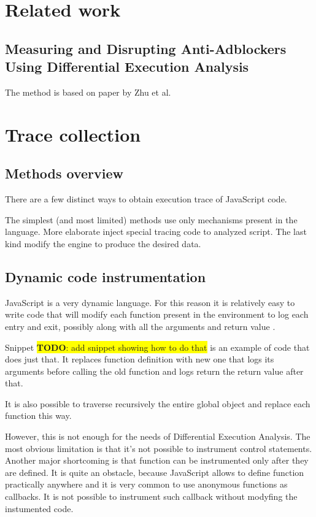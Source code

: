 \documentclass[en]{pracamgr}
\newcommand{\todo}[1]{\colorbox{yellow}{ \color{red} \textbf{TODO}: {#1}}}
\begin{document}
\chapter{Related work}
\section{Measuring and Disrupting Anti-Adblockers Using Differential Execution Analysis}

The method is based on paper by Zhu et al. \cite{DBLP:conf/ndss/ZhuHQSY18}



\chapter{Trace collection}

\section{Methods overview}
There are a few distinct ways to obtain execution trace of JavaScript code. 

The simplest (and most limited) methods use only mechanisms present in the language.
More elaborate inject special tracing code to analyzed script. The last kind modify the engine to produce
the desired data.

\section{Dynamic code instrumentation}
JavaScript is a very dynamic language. For this reason it is relatively easy to write code that will
modify each function present in the environment to log each entry and exit,
possibly along with all the arguments and return value \cite{stack:js-console-log}.

Snippet \todo{add snippet showing how to do that} is an example of code that does just that.
It replaces function definition with new one that logs its arguments before calling the old function and logs return
the return value after that. 

It is also possible to traverse recursively the entire global object and replace each function this way.

However, this is not enough for the needs of Differential Execution Analysis. 
The most obvious limitation is that it's not possible to instrument control statements.
Another major shortcoming is that function can be instrumented only after they are defined. 
It is quite an obstacle, because JavaScript allows to define function practically anywhere and it is very common
to use anonymous functions as callbacks. It is not possible to instrument such callback 
without modyfing the instumented code.
\end{document}
